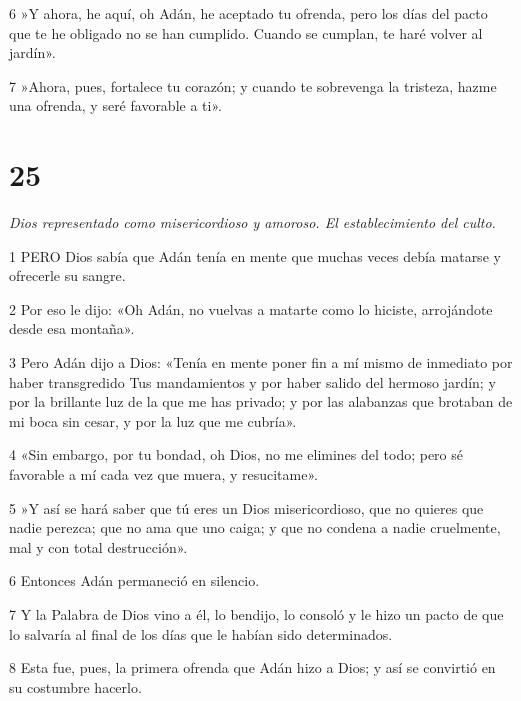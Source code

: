 \par 6 »Y ahora, he aquí, oh Adán, he aceptado tu ofrenda, pero los días del pacto que te he obligado no se han cumplido. Cuando se cumplan, te haré volver al jardín».

\par 7 »Ahora, pues, fortalece tu corazón; y cuando te sobrevenga la tristeza, hazme una ofrenda, y seré favorable a ti».

\chapter{25}

\par \textit{Dios representado como misericordioso y amoroso. El establecimiento del culto.}

\par 1 PERO Dios sabía que Adán tenía en mente que muchas veces debía matarse y ofrecerle su sangre.

\par 2 Por eso le dijo: «Oh Adán, no vuelvas a matarte como lo hiciste, arrojándote desde esa montaña».

\par 3 Pero Adán dijo a Dios: «Tenía en mente poner fin a mí mismo de inmediato por haber transgredido Tus mandamientos y por haber salido del hermoso jardín; y por la brillante luz de la que me has privado; y por las alabanzas que brotaban de mi boca sin cesar, y por la luz que me cubría».

\par 4 «Sin embargo, por tu bondad, oh Dios, no me elimines del todo; pero sé favorable a mí cada vez que muera, y resucitame».

\par 5 »Y así se hará saber que tú eres un Dios misericordioso, que no quieres que nadie perezca; que no ama que uno caiga; y que no condena a nadie cruelmente, mal y con total destrucción».

\par 6 Entonces Adán permaneció en silencio.

\par 7 Y la Palabra de Dios vino a él, lo bendijo, lo consoló y le hizo un pacto de que lo salvaría al final de los días que le habían sido determinados.

\par 8 Esta fue, pues, la primera ofrenda que Adán hizo a Dios; y así se convirtió en su costumbre hacerlo.

